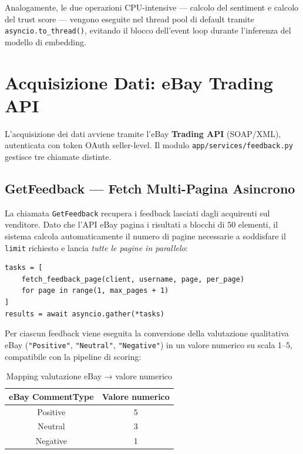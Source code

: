 Analogamente, le due operazioni CPU-intensive — calcolo del sentiment
e calcolo del trust score — vengono eseguite nel thread pool di default
tramite \texttt{asyncio.to\_thread()}, evitando il blocco dell'event
loop durante l'inferenza del modello di embedding.


\section{Acquisizione Dati: eBay Trading API}
\label{sec:seller-data}

L'acquisizione dei dati avviene tramite l'eBay \textbf{Trading API}
(SOAP/XML), autenticata con token OAuth seller-level. Il modulo
\texttt{app/services/feedback.py} gestisce tre chiamate distinte.

\subsection{GetFeedback — Fetch Multi-Pagina Asincrono}
\label{subsec:seller-feedback}

La chiamata \texttt{GetFeedback} recupera i feedback lasciati dagli
acquirenti sul venditore. Dato che l'API eBay pagina i risultati a
blocchi di 50 elementi, il sistema calcola automaticamente il numero
di pagine necessarie a soddisfare il \texttt{limit} richiesto
e lancia \emph{tutte le pagine in parallelo}:

\begin{verbatim}
tasks = [
    fetch_feedback_page(client, username, page, per_page)
    for page in range(1, max_pages + 1)
]
results = await asyncio.gather(*tasks)
\end{verbatim}

Per ciascun feedback viene eseguita la conversione della valutazione
qualitativa eBay (\texttt{"Positive"}, \texttt{"Neutral"},
\texttt{"Negative"}) in un valore numerico su scala 1–5,
compatibile con la pipeline di scoring:

\begin{table}[htbp]
\centering
\caption{Mapping valutazione eBay → valore numerico}
\label{tab:rating-map}
\begin{tabular}{cc}
\hline
\textbf{eBay CommentType} & \textbf{Valore numerico} \\
\hline
Positive  & 5 \\
Neutral   & 3 \\
Negative  & 1 \\
\hline
\end{tabular}
\end{table}

